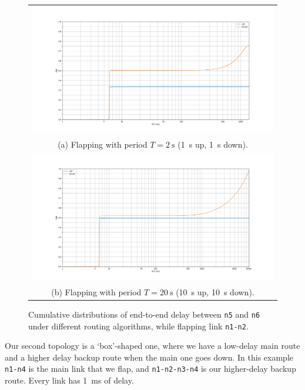\documentclass[10pt,twoside,a4paper]{article}
\begin{document}
\begin{figure}
\begin{tabular}{c}
  \includegraphics[width=190mm]{delay_partition_flap1} \\
  (a) Flapping with period $T=\SI{2}{\s}$ (\SI{1}{\s} up, \SI{1}{\s} down). \\ [6pt]
  \includegraphics[width=190mm]{delay_partition_flap10} \\
  (b) Flapping with period $T=\SI{20}{\s}$ (\SI{10}{\s} up, \SI{10}{\s} down). \\[6pt]
\end{tabular}
\caption{Cumulative distributions of end-to-end delay between \texttt{n5} and \texttt{n6} under different routing algorithms, while flapping link \texttt{n1-n2}.}
\end{figure}

\pagebreak


Our second topology is a `box'-shaped one, where we have a low-delay main route and a higher delay backup route when the main one goes down. In this example \texttt{n1-n4} is the main link that we flap, and \texttt{n1-n2-n3-n4} is our higher-delay backup route. Every link has \SI{1}{\ms} of delay.
\end{document}
